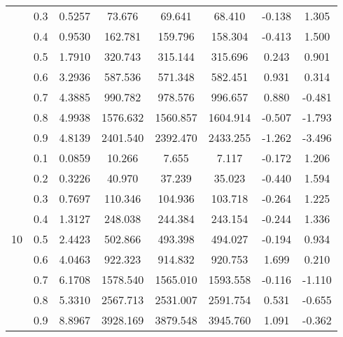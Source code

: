 \documentclass[11pt,a4paper]{report}
\begin{document}
\begin{longtable}{ | c | c || c | c | c | c | c | c | }
 & 0.3 & 0.5257 & 73.676 & 69.641 & 68.410 & -0.138 & 1.305 \\
 & 0.4 & 0.9530 & 162.781 & 159.796 & 158.304 & -0.413 & 1.500 \\
 & 0.5 & 1.7910 & 320.743 & 315.144 & 315.696 & 0.243 & 0.901 \\
 & 0.6 & 3.2936 & 587.536 & 571.348 & 582.451 & 0.931 & 0.314 \\
 & 0.7 & 4.3885 & 990.782 & 978.576 & 996.657 & 0.880 & -0.481 \\
 & 0.8 & 4.9938 & 1576.632 & 1560.857 & 1604.914 & -0.507 & -1.793 \\
 & 0.9 & 4.8139 & 2401.540 & 2392.470 & 2433.255 & -1.262 & -3.496 \\
 \hline
\multirow{9}{*}{10} & 0.1 & 0.0859 & 10.266 & 7.655 & 7.117 & -0.172 & 1.206 \\
 & 0.2 & 0.3226 & 40.970 & 37.239 & 35.023 & -0.440 & 1.594 \\
 & 0.3 & 0.7697 & 110.346 & 104.936 & 103.718 & -0.264 & 1.225 \\
 & 0.4 & 1.3127 & 248.038 & 244.384 & 243.154 & -0.244 & 1.336 \\
 & 0.5 & 2.4423 & 502.866 & 493.398 & 494.027 & -0.194 & 0.934 \\
 & 0.6 & 4.0463 & 922.323 & 914.832 & 920.753 & 1.699 & 0.210 \\
 & 0.7 & 6.1708 & 1578.540 & 1565.010 & 1593.558 & -0.116 & -1.110 \\
 & 0.8 & 5.3310 & 2567.713 & 2531.007 & 2591.754 & 0.531 & -0.655 \\
 & 0.9 & 8.8967 & 3928.169 & 3879.548 & 3945.760 & 1.091 & -0.362 \\
 \hline
\hline
\end{longtable}
\end{document}
